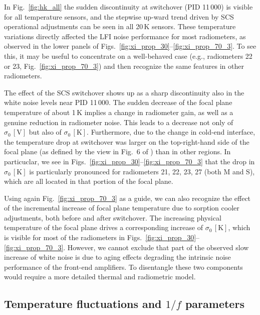 \documentclass[twocolumn]{aa}
\begin{document}
In Fig.~\ref{fig:hk_all} the sudden discontinuity at switchover (PID 11\,000) is visible 
for all temperature sensors, and the stepwise up-ward trend driven by 
SCS operational adjustments can be seen in all 20\,K sensors.
These temperature variations directly affected the
LFI noise performance for most radiometers, as observed in the lower
panels of Figs.~\ref{fig:xi_prop_30}--\ref{fig:xi_prop_70_3}. To see
this, it may be useful to concentrate on a well-behaved case (e.g.,
radiometers 22 or 23, Fig.~\ref{fig:xi_prop_70_3}) and then recognize
the same features in other radiometers.

The effect of the SCS switchover shows up as a sharp discontinuity
also in the white noise levels near PID 11\,000. The sudden decrease of
the focal plane temperature of about 1\,K implies a change in
radiometer gain, as well as a genuine reduction in radiometer
noise. This leads to a decrease not only of $\sigma_0 \,\mathrm{[V]}$ but also
of $\sigma_0 \,\mathrm{[K]}$. Furthermore, due to the change in cold-end
interface, the temperature drop at switchover was larger on the
top-right-hand side of the focal plane (as defined by the view in
Fig.~6 of \citealp{bp01}) than in other regions. In particuclar, we
see in Figs.~\ref{fig:xi_prop_30}--\ref{fig:xi_prop_70_3} that the
drop in $\sigma_0 \,\mathrm{[K]}$ is particularly pronounced for radiometers 21,
22, 23, 27 (both M and S), which are all located in that portion of
the focal plane.

Using again Fig.~\ref{fig:xi_prop_70_3} as a guide, we can also
recognize the effect of the incremental increase of focal plane
temperature due to sorption cooler adjustments, both before and after
switchover. The increasing physical temperature of the focal plane
drives a corresponding increase of $\sigma_0 \,\mathrm{[K]}$, which is visible
for most of the radiometers in
Figs.~\ref{fig:xi_prop_30}--\ref{fig:xi_prop_70_3}. However, we cannot
exclude that part of the observed slow increase of white noise is due
to aging effects degrading the intrinsic noise performance of the
front-end amplifiers. To disentangle these two components would
require a more detailed thermal and radiometric model.



\subsection{Temperature fluctuations and $1/f$ parameters}
\label{sec:temp_fluct_1f}
\end{document}
